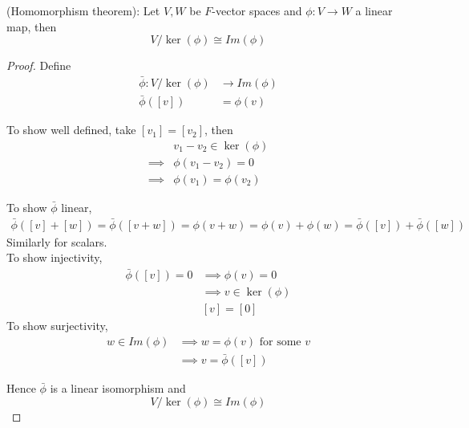 \begin{theorem}
    (Homomorphism theorem): Let $V, W$ be $F$-vector spaces and $\phi: V \to W$ a linear map, then 
    \[
        V / \ker( \phi) \cong Im( \phi)
    \]
\end{theorem}

\begin{proof}
    Define 
    \begin{align*}
        \bar{\phi}  : V / \ker( \phi) &\to Im( \phi) \\
        \bar{\phi} \left( \left[ v \right]  \right)  &= \phi(v)
    \end{align*}

    To show well defined, take $[ v_1] = \left[ v_2 \right] $, then 
    \begin{align*}
        & v_1 - v_2 \in \ker( \phi) \\
        \implies & \phi(v_1 - v_2) = 0 \\
        \implies & \phi(v_1) = \phi(v_2)
    \end{align*}

    To show $ \bar{\phi} $ linear, 
    \begin{align*}
        \bar{\phi} \left( \left[ v \right] + \left[ w \right]  \right)  = \bar{ \phi}  ( \left[ v + w \right] ) = \phi(v + w) = \phi(v) + \phi(w) = \bar{\phi}  \left( [v] \right)  + \bar{ \phi}  \left( [w] \right) 
    \end{align*}
    Similarly for scalars. \\

    To show injectivity, 
    \begin{align*}
        \bar{ \phi}  ( [v]) = 0 & \implies \phi(v) = 0 \\
        & \implies v \in \ker( \phi) \\
        & [v] = [0]
    \end{align*}
    To show surjectivity, 
    \begin{align*}
        w \in Im( \phi) &\implies w = \phi(v) \text{ for some } v \\
        & \implies v = \bar{ \phi}  ([v])
    \end{align*}

    Hence $ \bar{\phi} $ is a linear isomorphism and 
    \[
        V / \ker( \phi) \cong Im( \phi)
    \]
\end{proof}

